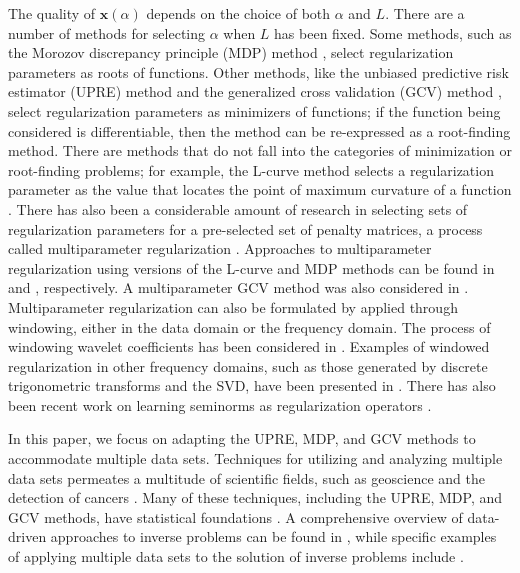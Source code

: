 \documentclass[12pt]{article}
\newcommand{\xVec}{\mathbf{x}}	%
\newcommand{\regparam}{\alpha}  %
\newcommand{\xReg}{\xVec(\regparam)}	%
\begin{document}
The quality of $\xReg$ depends on the choice of both $\regparam$ and $L$. There are a number of methods for selecting $\regparam$ when $L$ has been fixed. Some methods, such as the Morozov discrepancy principle (MDP) method \cite{Morozov1966}, select regularization parameters as roots of functions. Other methods, like the unbiased predictive risk estimator (UPRE) method \cite{Mallows1973} and the generalized cross validation (GCV) method \cite{Wahba1977,Wahba1990}, select regularization parameters as minimizers of functions; if the function being considered is differentiable, then the method can be re-expressed as a root-finding method. There are methods that do not fall into the categories of minimization or root-finding problems; for example, the L-curve method selects a regularization parameter as the value that locates the point of maximum curvature of a function \cite{Hansen1992,HansenOLeary}. There has also been a considerable amount of research in selecting sets of regularization parameters for a pre-selected set of penalty matrices, a process called multiparameter regularization \cite{Brezinski2003,ChungEspanol2017,GazzolaNovati2013,LuPereverzev2011,Wood2002}. Approaches to multiparameter regularization using versions of the L-curve and MDP methods can be found in \cite{BelgeKilmerMiller2002} and \cite{Wang2012}, respectively. A multiparameter GCV method was also considered in \cite{ModarresiGolub1,ModarresiGolub2}. Multiparameter regularization can also be formulated by applied through windowing, either in the data domain or the frequency domain. The process of windowing wavelet coefficients has been considered in \cite{EasleyLabatePatel,StephanakisKollias}. Examples of windowed regularization in other frequency domains, such as those generated by discrete trigonometric transforms and the SVD, have been presented in \cite{ChungEasleyOLeary,ChungKilmerOLeary,KalkeSiltanen}. There has also been recent work on learning seminorms as regularization operators \cite{Holler2020LearningNR}. \par 
In this paper, we focus on adapting the UPRE, MDP, and GCV methods to accommodate multiple data sets. Techniques for utilizing and analyzing multiple data sets permeates a multitude of scientific fields, such as geoscience \cite{GeoscienceML,Zobitz2020EfficientHD} and the detection of cancers \cite{MedicineML}. Many of these techniques, including the UPRE, MDP, and GCV methods, have statistical foundations \cite{StatLearning}. A comprehensive overview of data-driven approaches to inverse problems can be found in \cite{Arridge2019SolvingIP}, while specific examples of applying multiple data sets to the solution of inverse problems include \cite{ChungChungOLeary2011,ChungEspanol2017,HaberTenorio2003,KunischPock2013,TaroudakiOLeary2015,Learning2005}. \par 
\end{document}
